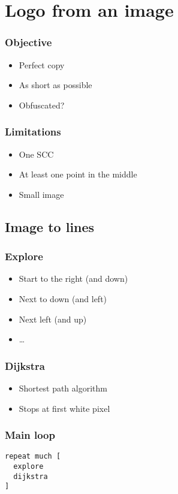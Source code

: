 \section{Logo from an image}

\begin{frame}
\frametitle{Objective}
  \begin{itemize}
    \item Perfect copy
    \item As short as possible
    \item Obfuscated?
  \end{itemize}
\end{frame}

\begin{frame}
\frametitle{Limitations}
  \begin{itemize}
    \item One SCC
    \item At least one point in the middle
    \item Small image
  \end{itemize}
\end{frame}

\subsection{Image to lines}

\begin{frame}
\frametitle{Explore}
  \begin{itemize}
    \item Start to the right (and down)
    \item Next to down (and left)
    \item Next left (and up)
    \item \ldots
  \end{itemize}
\end{frame}

\begin{frame}
\frametitle{Dijkstra}
  \begin{itemize}
    \item Shortest path algorithm
    \item Stops at first white pixel
  \end{itemize}
\end{frame}

\begin{frame}[fragile]
\frametitle{Main loop}
\begin{verbatim}
repeat much [
  explore
  dijkstra
]
\end{verbatim}
\end{frame}

